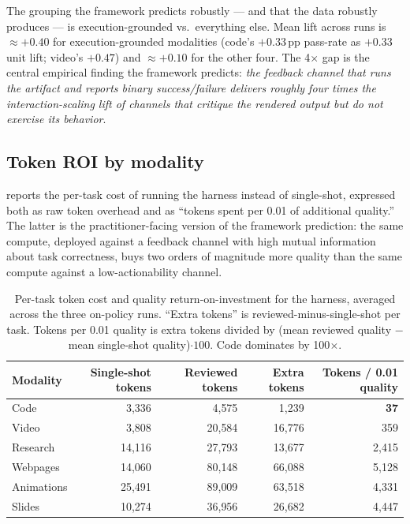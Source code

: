The grouping the framework predicts robustly --- and that the data robustly produces --- is execution-grounded vs.\ everything else. Mean lift across runs is $\approx +0.40$ for execution-grounded modalities (code's $+0.33$\,pp pass-rate as $+0.33$ unit lift; video's $+0.47$) and $\approx +0.10$ for the other four. The 4$\times$ gap is the central empirical finding the framework predicts: \emph{the feedback channel that runs the artifact and reports binary success/failure delivers roughly four times the interaction-scaling lift of channels that critique the rendered output but do not exercise its behavior}.

\subsection{Token ROI by modality}
\label{sec:harness-roi}

 reports the per-task cost of running the harness instead of single-shot, expressed both as raw token overhead and as ``tokens spent per 0.01 of additional quality.'' The latter is the practitioner-facing version of the framework prediction: the same compute, deployed against a feedback channel with high mutual information about task correctness, buys two orders of magnitude more quality than the same compute against a low-actionability channel.

\begin{table}[t]
\centering
\caption{Per-task token cost and quality return-on-investment for the harness, averaged across the three on-policy runs. ``Extra tokens'' is reviewed-minus-single-shot per task. Tokens per 0.01 quality is extra tokens divided by (mean reviewed quality $-$ mean single-shot quality)$\cdot 100$. Code dominates by 100$\times$.}
\label{tab:harness-roi}
\small
\begin{tabular}{lrrrr}
\toprule
Modality & Single-shot tokens & Reviewed tokens & Extra tokens & Tokens / 0.01 quality \\
\midrule
Code        & 3{,}336  & 4{,}575  & 1{,}239  & \textbf{37} \\
Video       & 3{,}808  & 20{,}584 & 16{,}776 & 359 \\
Research    & 14{,}116 & 27{,}793 & 13{,}677 & 2{,}415 \\
Webpages    & 14{,}060 & 80{,}148 & 66{,}088 & 5{,}128 \\
Animations  & 25{,}491 & 89{,}009 & 63{,}518 & 4{,}331 \\
Slides      & 10{,}274 & 36{,}956 & 26{,}682 & 4{,}447 \\
\bottomrule
\end{tabular}
\end{table}

